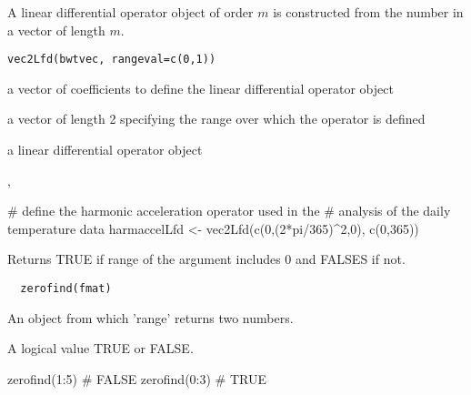 \documentclass{article}
\begin{document}
\begin{Description}\relax
A linear differential operator object of order $m$ is
constructed from the number in a vector of length $m$.
\end{Description}
\begin{Usage}
\begin{verbatim}
vec2Lfd(bwtvec, rangeval=c(0,1))
\end{verbatim}
\end{Usage}
\begin{Arguments}
\begin{ldescription}
\item[\code{bwtvec}] a vector of coefficients to define the linear differential
operator object

\item[\code{rangeval}] a vector of length 2 specifying the range over which the
operator is defined

\end{ldescription}
\end{Arguments}
\begin{Value}
a linear differential operator object
\end{Value}
\begin{SeeAlso}\relax
{}, 
\end{SeeAlso}
\begin{Examples}
\begin{ExampleCode}
#  define the harmonic acceleration operator used in the
#  analysis of the daily temperature data
harmaccelLfd <- vec2Lfd(c(0,(2*pi/365)^2,0), c(0,365))
\end{ExampleCode}
\end{Examples}

\begin{Description}\relax
Returns TRUE if range of the argument includes 0 and FALSES if not.
\end{Description}
\begin{Usage}
\begin{verbatim}
  zerofind(fmat)
\end{verbatim}
\end{Usage}
\begin{Arguments}
\begin{ldescription}
\item[\code{fmat}] An object from which 'range' returns two numbers.  

\end{ldescription}
\end{Arguments}
\begin{Value}
A logical value TRUE or FALSE.
\end{Value}
\begin{SeeAlso}\relax
{}
\end{SeeAlso}
\begin{Examples}
\begin{ExampleCode}
zerofind(1:5)
# FALSE
zerofind(0:3)
# TRUE 
\end{ExampleCode}
\end{Examples}
\end{document}
